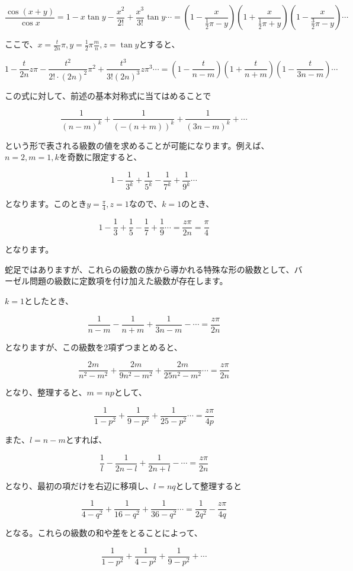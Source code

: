 \documentclass[./main]{subfiles}
\theoremstyle{break}
\begin{document}
\[\frac{\cos (x+y)}{\cos x}=1 -x\tan y- \frac{x^2}{2!}+\frac{x^3}{3!}\tan y\cdots=\left( 1-\frac{x}{\frac{1}{2}\pi -y} \right)\left( 1+\frac{x}{\frac{1}{2}\pi+y} \right)\left( 1-\frac{x}{\frac{3}{2}\pi-y} \right)\cdots\]

ここで、$x=\frac{t}{2n}\pi ,y=\frac{1}{2}\pi \frac{m}{n},z=\tan y$とすると、

\[1 -\frac{t}{2n}z\pi - \frac{t^2}{2!\cdot (2n)^2}\pi^2+\frac{t^3}{3!(2n)^3}z\pi^3\cdots=\left( 1-\frac{t}{n-m} \right)\left( 1+\frac{t}{n+m} \right)\left( 1-\frac{t}{3n-m} \right)\cdots\]

この式に対して、前述の基本対称式に当てはめることで

\[\frac{1}{(n-m)^k}+\frac{1}{(-(n+m))^k}+\frac{1}{(3n-m)^k}+\cdots\]

という形で表される級数の値を求めることが可能になります。例えば、$n=2,m=1,k$を奇数に限定すると、

\[1-\frac{1}{3^k}+\frac{1}{5^k}-\frac{1}{7^k}+\frac{1}{9^k}\cdots\]

となります。このとき$y=\frac{\pi}{4},z=1$なので、$k=1$のとき、

\[1-\frac{1}{3}+\frac{1}{5}-\frac{1}{7}+\frac{1}{9}\cdots=\frac{z\pi}{2n}=\frac{\pi}{4}\]

となります。

蛇足ではありますが、これらの級数の族から導かれる特殊な形の級数として、バーゼル問題の級数に定数項を付け加えた級数が存在します。

$k=1$としたとき、

\[\frac{1}{n-m}-\frac{1}{n+m}+\frac{1}{3n-m}-\cdots=\frac{z\pi}{2n}\]

となりますが、この級数を2項ずつまとめると、

\[\frac{2m}{n^2-m^2}+\frac{2m}{9n^2-m^2}+\frac{2m}{25n^2-m^2}\cdots=\frac{z\pi}{2n}\]

となり、整理すると、$m=np$として、

\[\frac{1}{1-p^2}+\frac{1}{9-p^2}+\frac{1}{25-p^2}\cdots=\frac{z\pi}{4p}\]

また、$l=n-m$とすれば、

\[\frac{1}{l}-\frac{1}{2n-l}+\frac{1}{2n+l}-\cdots=\frac{z\pi}{2n}\]

となり、最初の項だけを右辺に移項し、$l=nq$として整理すると

\[\frac{1}{4-q^2}+\frac{1}{16-q^2}+\frac{1}{36-q^2}\cdots=\frac{1}{2q^2}-\frac{z\pi}{4q}\]

となる。これらの級数の和や差をとることによって、

\[\frac{1}{1-p^2}+\frac{1}{4-p^2}+\frac{1}{9-p^2}+\cdots\]
\end{document}
